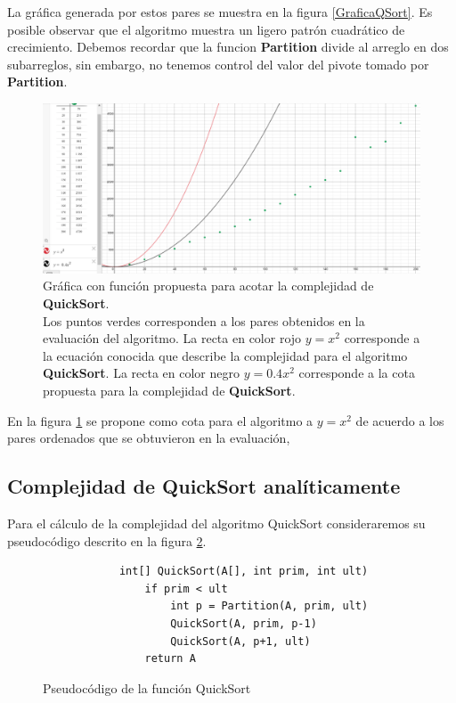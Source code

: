         La gráfica generada por estos pares se muestra en la figura \ref{GraficaQSort}. Es posible observar que el algoritmo muestra un ligero  patrón cuadrático de crecimiento. Debemos recordar que la funcion \textbf{Partition} divide al arreglo en dos subarreglos, sin embargo, no tenemos control del valor del pivote tomado por \textbf{Partition}.
        
        \begin{figure}[h!]
            \centering
            \includegraphics[width=17.5cm]{QuickSort/desmos-QSort.png}
            \caption{Gráfica con función propuesta para acotar la complejidad de \textbf{QuickSort}. \\Los puntos verdes corresponden a los pares obtenidos en la evaluación del algoritmo. La recta en color rojo $y=x^{2}$ corresponde a la ecuación conocida que describe la complejidad para el algoritmo \textbf{QuickSort}. La recta en color negro $y=0.4x^{2}$ corresponde a la cota propuesta para la complejidad de \textbf{QuickSort}.}
            \label{GraficaDesmosQSort}
        \end{figure}
        
        En la figura \ref{GraficaDesmosQSort} se propone como cota para el algoritmo a $y=x^{2}$ de acuerdo a los pares ordenados que se obtuvieron en la evaluación, 
        
    \subsection*{Complejidad de \textbf{QuickSort} analíticamente}
        Para el cálculo de la complejidad del algoritmo QuickSort consideraremos su pseudocódigo descrito en la figura \ref{PseudocodigoQSort}.
        
        \begin{figure}[h!]
        \centering
        \begin{verbatim}
            int[] QuickSort(A[], int prim, int ult)
                if prim < ult
                    int p = Partition(A, prim, ult)
                    QuickSort(A, prim, p-1)
                    QuickSort(A, p+1, ult)
                return A
        \end{verbatim}
        \caption{Pseudocódigo de la función QuickSort}
        \label{PseudocodigoQSort}
        \end{figure}
        

